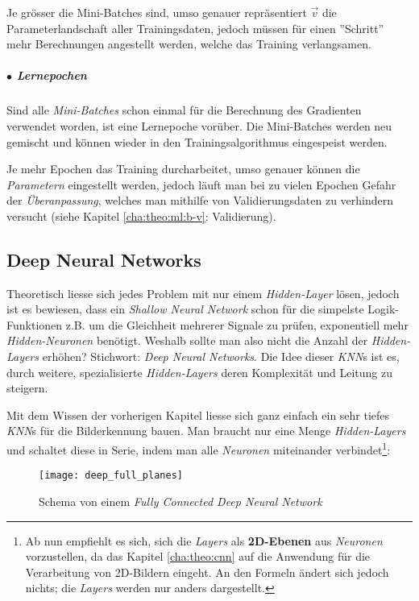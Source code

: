 Je grösser die Mini-Batches sind, umso genauer repräsentiert $\vec{v}$ die Parameterlandschaft aller Trainingsdaten, jedoch müssen für einen ''Schritt'' mehr Berechnungen angestellt werden, welche das Training verlangsamen.


\subparagraph{$\bullet$ Lernepochen} Sind alle \textit{Mini-Batches} schon einmal für die Berechnung des Gradienten verwendet worden, ist eine Lernepoche vorüber. Die Mini-Batches werden neu gemischt und können wieder in den Trainingsalgorithmus eingespeist werden.

Je mehr Epochen das Training durcharbeitet, umso genauer können die \textit{Parametern} eingestellt werden, jedoch läuft man bei zu vielen Epochen Gefahr der \textit{Überanpassung}, welches man mithilfe von Validierungsdaten zu verhindern versucht (siehe Kapitel \ref{cha:theo:ml:b-v}: Validierung).


\subsection[DNNs]{Deep Neural Networks}\label{cha:theo:dl}
Theoretisch liesse sich jedes Problem mit nur einem \textit{Hidden-Layer} lösen, jedoch ist es bewiesen, dass ein \textit{Shallow Neural Network} schon für die simpelste Logik-Funktionen z.B. um die Gleichheit mehrerer Signale zu prüfen, exponentiell mehr \textit{Hidden-Neuronen} benötigt\cite{hastad}. Weshalb sollte man also nicht die Anzahl der \textit{Hidden-Layers} erhöhen? Stichwort: \textit{Deep Neural Networks}. Die Idee dieser \textit{KNN}s ist es, durch weitere, spezialisierte \textit{Hidden-Layers} deren Komplexität und Leitung zu steigern.

Mit dem Wissen der vorherigen Kapitel liesse sich ganz einfach ein sehr tiefes \textit{KNN}s für die Bilderkennung bauen. Man braucht nur eine Menge \textit{Hidden-Layers} und schaltet diese in Serie, indem man alle \textit{Neuronen} miteinander verbindet\footnote{Ab nun empfiehlt es sich, sich die \textit{Layers} als \textbf{2D-Ebenen} aus \textit{Neuronen} vorzustellen, da das Kapitel \ref{cha:theo:cnn} auf die Anwendung für die Verarbeitung von 2D-Bildern eingeht. An den Formeln ändert sich jedoch nichts; die \textit{Layers} werden nur anders dargestellt.}:

\begin{figure}[h]
	\centering
	\texttt{[image: deep\_full\_planes]}
	\caption[\textit{Fully Connected Deep Neural Network}]{Schema von einem \textit{Fully Connected Deep Neural Network}}
	\label{img:deep_full}
\end{figure}

